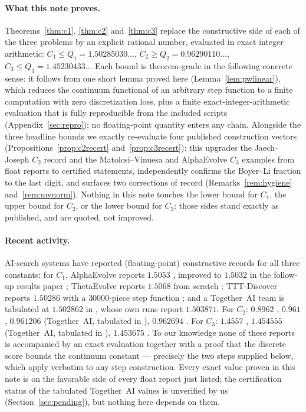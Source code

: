 \documentclass[11pt]{article}
\theoremstyle{remark}
\begin{document}
\paragraph{What this note proves.} Theorems~\ref{thm:c1}, \ref{thm:c2}
and~\ref{thm:c3} replace the constructive side of each of the three problems
by an explicit rational number, evaluated in exact integer arithmetic:
$C_1 \le Q_1 = 1.50285030\ldots$, $C_2 \ge Q_2 = 0.96290110\ldots$,
$C_3 \le Q_3 = 1.45230433\ldots$ Each bound is theorem-grade in the
following concrete sense: it follows from one short lemma proved here
(Lemma~\ref{lem:pwlinear}), which reduces the continuum functional of an
arbitrary step function to a finite computation with zero discretization
loss, plus a finite exact-integer-arithmetic evaluation that is fully
reproducible from the included scripts (Appendix~\ref{sec:repro}); no
floating-point quantity enters any chain. Alongside the three headline
bounds we exactly re-evaluate four published construction vectors
(Propositions~\ref{prop:c2recert} and~\ref{prop:c3recert}): this upgrades
the Jaech--Joseph $C_2$ record and the Matolcsi--Vinuesa and AlphaEvolve
$C_3$ examples from float reports to certified statements, independently
confirms the Boyer--Li fraction to the last digit, and surfaces two
corrections of record (Remarks~\ref{rem:hygiene} and~\ref{rem:mvnorm}).
Nothing in this note touches the lower bound for $C_1$, the upper bound for
$C_2$, or the lower bound for $C_3$: those sides stand exactly as published,
and are quoted, not improved.

\paragraph{Recent activity.} AI-search systems have reported (floating-point)
constructive records for all three constants: for $C_1$, AlphaEvolve reports
$1.5053$ \cite{AlphaEvolve25}, improved to $1.5032$ in the follow-up results
paper \cite{MathScale25}; ThetaEvolve reports $1.5068$ from scratch
\cite{ThetaEvolve25}; TTT-Discover reports $1.50286$ with a $30000$-piece
step function \cite{TTT26}; and a Together~AI team is tabulated at
$1.502862$ in \cite{SimpleTES26}, whose own runs report $1.503871$. For
$C_2$: $0.8962$ \cite{AlphaEvolve25}, $0.961$ \cite{MathScale25},
$0.961206$ (Together~AI, tabulated in \cite{SimpleTES26}), $0.962694$
\cite{SimpleTES26}. For $C_3$: $1.4557$ \cite{AlphaEvolve25,MathScale25},
$1.454555$ (Together~AI, tabulated in \cite{SimpleTES26}), $1.453675$
\cite{SimpleTES26}. To our knowledge none of these reports is accompanied by
an exact evaluation together with a proof that the discrete score bounds the
continuum constant --- precisely the two steps supplied below, which apply
verbatim to any step construction. Every exact value proven in this note is
on the favorable side of every float report just listed; the certification
status of the tabulated Together~AI values is unverified by us
(Section~\ref{sec:pending}), but nothing here depends on them.
\end{document}
